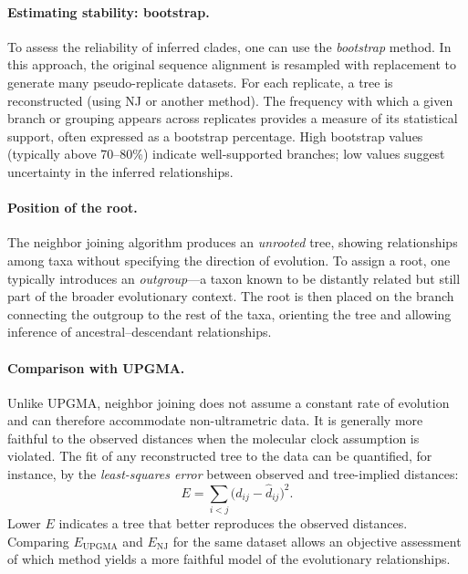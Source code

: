 \paragraph{Estimating stability: bootstrap.}
To assess the reliability of inferred clades, one can use the \emph{bootstrap} method. In this approach, the original sequence alignment is resampled with replacement to generate many pseudo-replicate datasets. For each replicate, a tree is reconstructed (using NJ or another method). The frequency with which a given branch or grouping appears across replicates provides a measure of its statistical support, often expressed as a bootstrap percentage. High bootstrap values (typically above 70–80\%) indicate well-supported branches; low values suggest uncertainty in the inferred relationships.

\paragraph{Position of the root.}
The neighbor joining algorithm produces an \emph{unrooted} tree, showing relationships among taxa without specifying the direction of evolution. To assign a root, one typically introduces an \emph{outgroup}—a taxon known to be distantly related but still part of the broader evolutionary context. The root is then placed on the branch connecting the outgroup to the rest of the taxa, orienting the tree and allowing inference of ancestral–descendant relationships.

\paragraph{Comparison with UPGMA.}
Unlike UPGMA, neighbor joining does not assume a constant rate of evolution and can therefore accommodate non-ultrametric data. It is generally more faithful to the observed distances when the molecular clock assumption is violated. The fit of any reconstructed tree to the data can be quantified, for instance, by the \emph{least-squares error} between observed and tree-implied distances:
\[
E = \sum_{i<j}\bigl(d_{ij} - \hat d_{ij}\bigr)^2.
\]
Lower $E$ indicates a tree that better reproduces the observed distances. Comparing $E_{\mathrm{UPGMA}}$ and $E_{\mathrm{NJ}}$ for the same dataset allows an objective assessment of which method yields a more faithful model of the evolutionary relationships.
